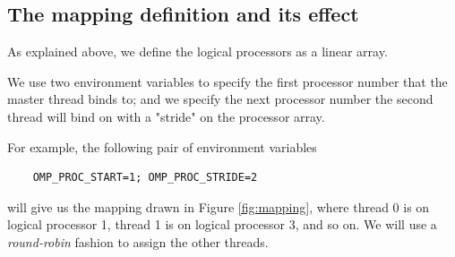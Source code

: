 \subsection{The mapping definition and its effect}

As explained above, we define the logical processors as a linear array. 


We use two environment variables to specify the first processor number that the
master thread binds to; and we specify the next processor number the second
thread will bind on with a "stride" on the processor array. 

For example, the following pair of environment variables

{\footnotesize
\begin{verbatim} 
    OMP_PROC_START=1; OMP_PROC_STRIDE=2
\end{verbatim}
}

will give us the mapping drawn in Figure \ref{fig:mapping}, where thread 0 is
on logical processor 1, thread 1 is on logical processor 3, and so on.  
We will use a \emph{round-robin} fashion to assign the other threads. 


%
%
%
%
%



